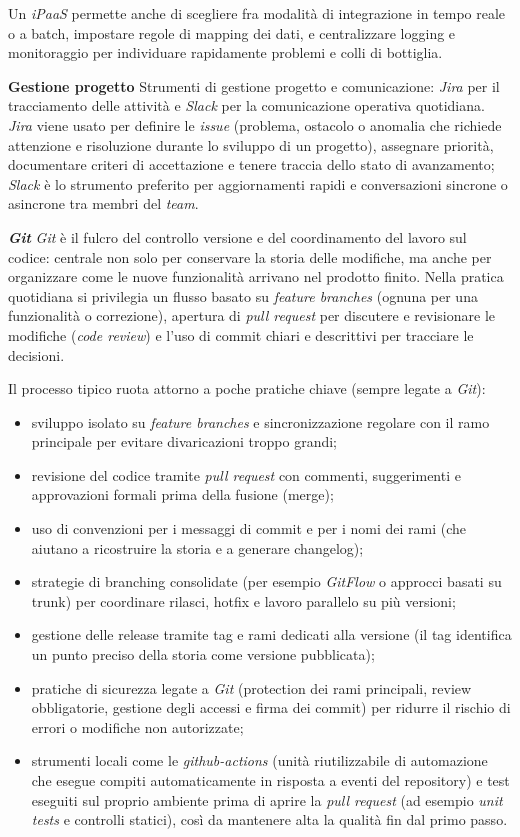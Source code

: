 Un \emph{iPaaS} permette anche di scegliere fra modalità di integrazione 
in tempo reale o a batch, impostare regole di mapping dei dati, e centralizzare logging e monitoraggio per individuare rapidamente problemi e colli di bottiglia.

\medskip
\noindent\textbf{Gestione progetto}
Strumenti di gestione progetto e comunicazione: \emph{Jira} per il tracciamento delle attività e \emph{Slack} per la comunicazione operativa quotidiana. \emph{Jira} 
viene usato per definire le \emph{issue} (problema, ostacolo o anomalia che richiede attenzione e risoluzione durante lo sviluppo di un progetto), assegnare priorità, documentare criteri di accettazione e tenere traccia dello stato di avanzamento; \emph{Slack} 
è lo strumento preferito per aggiornamenti rapidi e conversazioni sincrone o asincrone tra membri del \emph{team}.

\medskip
\noindent\textbf{\emph{Git}}
\emph{Git} è il fulcro del controllo versione e del coordinamento del lavoro sul codice: 
centrale non solo per conservare la storia delle modifiche, ma anche per organizzare come le nuove funzionalità arrivano nel prodotto finito. 
Nella pratica quotidiana si privilegia un flusso basato su \emph{feature branches} (ognuna per una funzionalità o correzione), 
apertura di \emph{pull request} per discutere e revisionare le modifiche (\emph{code review}) e l’uso di commit chiari e descrittivi per tracciare le decisioni.

Il processo tipico ruota attorno a poche pratiche chiave (sempre legate a \emph{Git}):
\begin{itemize}
\item sviluppo isolato su \emph{feature branches} e sincronizzazione regolare con il ramo principale per evitare divaricazioni troppo grandi;
\item revisione del codice tramite \emph{pull request} con commenti, suggerimenti e approvazioni formali prima della fusione (merge);
\item uso di convenzioni per i messaggi di commit e per i nomi dei rami (che aiutano a ricostruire la storia e a generare changelog);
\item strategie di branching consolidate (per esempio \emph{GitFlow} o approcci basati su trunk) per coordinare rilasci, hotfix e lavoro parallelo su più versioni;
\item gestione delle release tramite tag e rami dedicati alla versione (il tag identifica un punto preciso della storia come versione pubblicata);
\item pratiche di sicurezza legate a \emph{Git} (protection dei rami principali, review obbligatorie, gestione degli accessi e firma dei commit) per ridurre il rischio di errori o modifiche non autorizzate;
\item strumenti locali come le \emph{github-actions} (unità riutilizzabile di automazione che esegue compiti automaticamente in risposta a eventi del repository) e test eseguiti sul proprio ambiente prima di aprire la \emph{pull request} (ad esempio \emph{unit tests} e controlli statici), così da mantenere alta la qualità fin dal primo passo.
\end{itemize}

